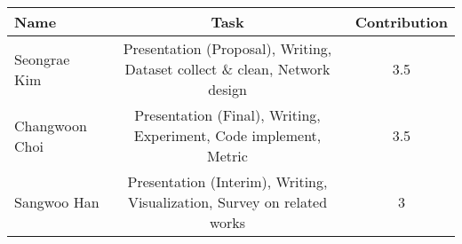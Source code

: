 \begin{table}[h!]
    \centering
    \begin{tabular}{l|c|c}
        \toprule
        Name & Task & Contribution\\
        \midrule
        Seongrae Kim& Presentation (Proposal), Writing, Dataset collect \& clean, Network design & 3.5\\
        Changwoon Choi& Presentation (Final), Writing, Experiment, Code implement, Metric & 3.5\\
        Sangwoo Han& Presentation (Interim), Writing, Visualization, Survey on related works & 3\\
        \bottomrule
    \end{tabular}
\end{table}